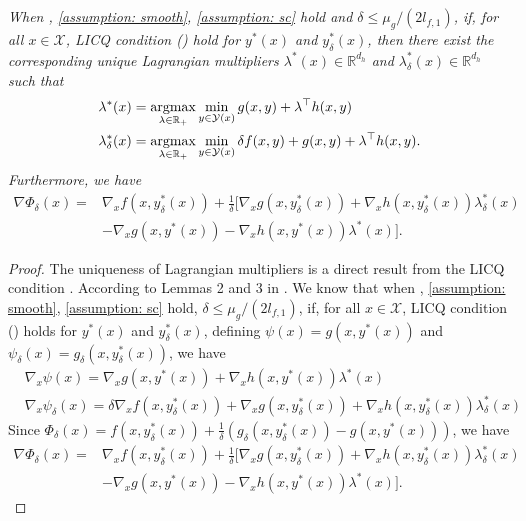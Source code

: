 \documentclass{article}
\newcommand{\Xc}{\mathcal{X}}
\newcommand{\Yc}{\mathcal{Y}}
\def\R{\mathbb{R}}
\newcommand{\argmax}{\mathop{\rm argmax}}
\theoremstyle{plain}
\theoremstyle{definition}
\theoremstyle{remark}
\begin{document}
\subsection*{}
\emph{When , \ref{assumption: smooth}, \ref{assumption: sc} hold and $\delta \leq \mu_g/(2l_{f,1})$, if, for all $x\in \Xc$, LICQ condition () hold for $y^*(x)$ and $y^*_\delta(x)$, then there exist the corresponding unique Lagrangian multipliers $\lambda^*(x)\in \R^{d_h}$ and $\lambda^*_\delta(x)\in \R^{d_h}$ such that
    \begin{align}
        &\lambda^*(x)=\argmax_{\lambda \in \R_+}\min_{y \in \Yc(x)}g(x,y)+\lambda^\top h(x,y)\\ 
        &\lambda^*_\delta(x)=\argmax_{\lambda \in \R_+}\min_{y \in \Yc(x)}\delta f(x,y)+g(x,y)+\lambda^\top h(x,y).
    \end{align}
Furthermore, we have
    \begin{align}\nonumber
        \nabla \Phi_\delta(x)=&\nabla_x f(x, y^*_\delta(x))+\frac{1}{\delta}[\nabla_x g(x, y^*_\delta(x))+\nabla_x h(x, y^*_\delta(x))\lambda^*_\delta(x)\\
        &-\nabla_x g(x, y^*(x))-\nabla_x h(x, y^*(x))\lambda^*(x)].
    \end{align}}
    
\begin{proof}
    The uniqueness of Lagrangian multipliers is a direct result from the LICQ condition \citep{wachsmuth2013licq}. 
    According to Lemmas 2 and 3 in \cite{jiang2024primal}. We know that when , \ref{assumption: smooth}, \ref{assumption: sc} hold,  $\delta \leq \mu_g/(2l_{f,1})$, if, for all $x\in \Xc$, LICQ condition () holds for $y^*(x)$ and $y^*_\delta(x)$, defining $\psi(x)=g(x, y^*(x))$ and $\psi_\delta(x)=g_\delta(x, y^*_\delta(x))$, we have
    \begin{align*}
        &\nabla_x \psi(x)=\nabla_x g(x, y^*(x))+\nabla_x h(x, y^*(x))\lambda^*(x)\\
        &\nabla_x \psi_\delta(x)=\delta \nabla_x f(x,y^*_\delta(x))+\nabla_x g(x,y^*_\delta(x))+\nabla_x h(x, y^*_\delta(x))\lambda^*_\delta(x)
    \end{align*}
    Since $\Phi_\delta(x)=f(x,y_\delta^*(x))+\frac{1}{\delta}(g_\delta(x, y^*_\delta(x))-g(x, y^*(x)))$, we have
    \begin{align*}
        \nabla \Phi_\delta(x)=&\nabla_x f(x, y^*_\delta(x))+\frac{1}{\delta}[\nabla_x g(x, y^*_\delta(x))+\nabla_x h(x, y^*_\delta(x))\lambda^*_\delta(x)\\
        &-\nabla_x g(x, y^*(x))-\nabla_x h(x, y^*(x))\lambda^*(x)].
    \end{align*}
\end{proof}
\end{document}
